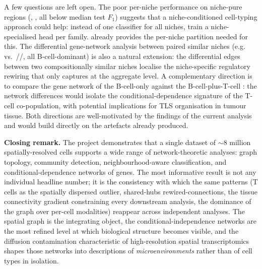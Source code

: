 A few questions are left open. The poor per-niche performance on niche-pure regions (, ,  all below median test $F_1$) suggests that a niche-conditioned cell-typing approach could help: instead of one classifier for all niches, train a niche-specialised head per family.  already provides the per-niche partition needed for this. The differential gene-network analysis between paired similar niches (e.g.\  vs.\ //, all B-cell-dominant) is also a natural extension: the differential edges between two compositionally similar niches localise the niche-specific regulatory rewiring that  only captures at the aggregate level. A complementary direction is to compare the gene network of the B-cell-only  against the B-cell-plus-T-cell : the network differences would isolate the conditional-dependence signature of the T-cell co-population, with potential implications for TLS organisation in tumour tissue. Both directions are well-motivated by the findings of the current analysis and would build directly on the artefacts already produced.

\medskip

\noindent\textbf{Closing remark.} The project demonstrates that a single dataset of $\sim 8$ million spatially-resolved cells supports a wide range of network-theoretic analyses: graph topology, community detection, neighbourhood-aware classification, and conditional-dependence networks of genes. The most informative result is not any individual headline number; it is the consistency with which the same patterns (T cells as the spatially dispersed outlier, shared-hubs rewired-connections, the tissue connectivity gradient constraining every downstream analysis, the dominance of the graph over per-cell modalities) reappear across independent analyses. The spatial graph is the integrating object, the conditional-independence networks are the most refined level at which biological structure becomes visible, and the diffusion contamination characteristic of high-resolution spatial transcriptomics shapes those networks into descriptions of \emph{microenvironments} rather than of cell types in isolation.